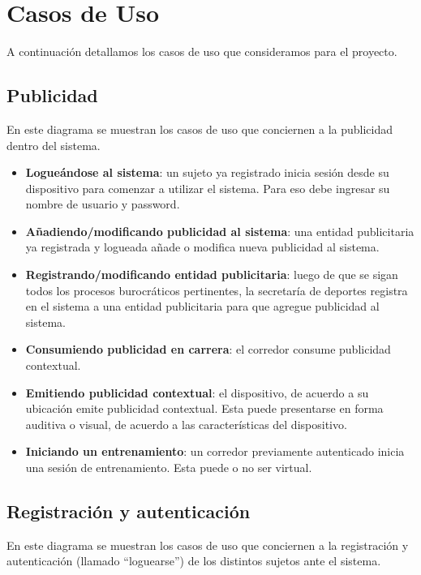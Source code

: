 \section{Casos de Uso}

A continuación detallamos los casos de uso que consideramos para el proyecto.

\subsection{Publicidad}
En este diagrama se muestran los casos de uso que conciernen a la publicidad dentro del sistema.


\begin{itemize}
	\item \textbf{Logueándose al sistema}: un sujeto ya registrado inicia sesión desde su dispositivo para comenzar a utilizar el sistema. Para eso debe ingresar su nombre de usuario y password.
	\item \textbf{Añadiendo/modificando publicidad al sistema}: una entidad publicitaria ya registrada y logueada añade o modifica nueva publicidad al sistema.
	\item \textbf{Registrando/modificando entidad publicitaria}: luego de que se sigan todos los procesos burocráticos pertinentes, la secretaría de deportes registra en el sistema a una entidad publicitaria para que agregue publicidad al sistema.
	\item \textbf{Consumiendo publicidad en carrera}: el corredor consume publicidad contextual.
	\item \textbf{Emitiendo publicidad contextual}: el dispositivo, de acuerdo a su ubicación emite publicidad contextual. Esta puede presentarse en forma auditiva o visual, de acuerdo a las características del dispositivo.
	\item \textbf{Iniciando un entrenamiento}: un corredor previamente autenticado inicia una sesión de entrenamiento. Esta puede o no ser virtual.
\end{itemize}

\subsection{Registración y autenticación}
En este diagrama se muestran los casos de uso que conciernen a la registración y autenticación (llamado ``loguearse'') de los distintos sujetos ante el sistema. 

